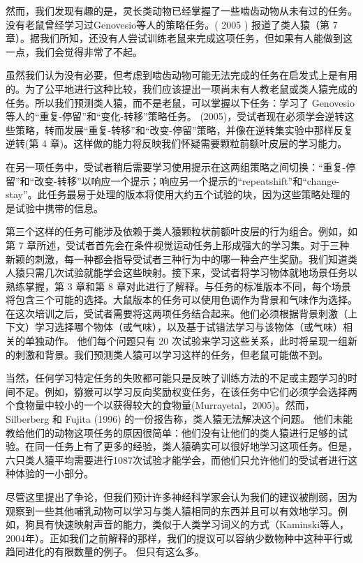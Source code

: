 \par 
然而，我们发现有趣的是，灵长类动物已经掌握了一些啮齿动物从未有过的任务。没有老鼠曾经学习过Genovesio等人的策略任务。( 2005 ) 报道了类人猿（第 7 章）。据我们所知，还没有人尝试训练老鼠来完成这项任务，但如果有人能做到这一点，我们会觉得非常了不起。
\par 
虽然我们认为没有必要，但考虑到啮齿动物可能无法完成的任务在启发式上是有用的。为了公平地进行这种比较，我们应该提出一项尚未有人教老鼠或类人猿完成的任务。所以我们预测类人猿，而不是老鼠，可以掌握以下任务：学习了 Genovesio等人的“重复-停留”和“变化-转移”策略任务。 (2005)，受试者现在必须学会逆转这些策略，转而发展“重复-转移”和“改变-停留”策略，并像在逆转集实验中那样反复逆转(第 4 章)。这样做的能力将反映我们怀疑需要颗粒前额叶皮层的学习能力。
\par 
在另一项任务中，受试者稍后需要学习使用提示在这两组策略之间切换：“重复-停留”和“改变-转移”以响应一个提示；响应另一个提示的“repeatshift”和“change-stay”。此任务最易于处理的版本将使用大约五个试验的块，因为这些策略处理的是试验中携带的信息。
\par 
第三个这样的任务可能涉及依赖于类人猿颗粒状前额叶皮层的行为组合。例如，如第 7 章所述，受试者首先会在条件视觉运动任务上形成强大的学习集。对于三种新颖的刺激，每一种都会指导受试者三种行为中的哪一种会产生奖励。我们知道类人猿只需几次试验就能学会这些映射。接下来，受试者将学习物体就地场景任务以熟练掌握，第 3 章和第 8 章对此进行了解释。与任务的标准版本不同，每个场景将包含三个可能的选择。大鼠版本的任务可以使用色调作为背景和气味作为选择。在这次培训之后，受试者需要将这两项任务结合起来。他们必须根据背景刺激（上下文）学习选择哪个物体（或气味），以及基于试错法学习与该物体（或气味）相关的单独动作。 他们每个问题只有 20 次试验来学习这些关系，此时将呈现一组新的刺激和背景。我们预测类人猿可以学习这样的任务，但老鼠可能做不到。
\par 
当然，任何学习特定任务的失败都可能只是反映了训练方法的不足或主题学习的时间不足。例如，猕猴可以学习反向奖励权变任务，在该任务中它们必须学会选择两个食物量中较小的一个以获得较大的食物量(Murrayetal，2005)。然而，Silberberg 和 Fujita (1996) 的一份报告称，类人猿无法解决这个问题。 他们未能教给他们的动物这项任务的原因很简单：他们没有让他们的类人猿进行足够的试验。在同一任务上有了更多的经验，类人猿确实可以很好地学习这项任务。但是，六只类人猿平均需要进行1087次试验才能学会，而他们只允许他们的受试者进行这种体验的一小部分。
\par 
尽管这里提出了争论，但我们预计许多神经科学家会认为我们的建议被削弱，因为观察到一些其他哺乳动物可以学习与类人猿相同的东西并且可以有效地学习。例如，狗具有快速映射声音的能力，类似于人类学习词义的方式（Kaminski等人，2004年）。正如我们之前解释的那样，我们的提议可以容纳少数物种中这种平行或趋同进化的有限数量的例子。 但只有这么多。
